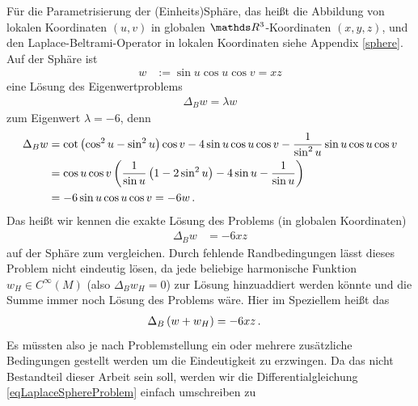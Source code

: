     \begin{beispiel}[Einheitssphäre]
       Für die Parametrisierung der (Einheits)Sphäre, das heißt die Abbildung von lokalen Koordinaten
       \( \left( u,v \right) \) in globalen \(\R^{3} \)-Koordinaten \( \left( x,y,z \right) \), 
       und den Laplace-Beltrami-Operator in lokalen Koordinaten siehe Appendix \ref{sphere}.
       Auf der Sphäre ist
       \begin{align}
         w &:= \sin u \cos u \cos v = x z
       \end{align}
       eine Lösung des Eigenwertproblems
       \begin{align}
         \Delta_{B} w = \lambda w
       \end{align}
       zum Eigenwert \( \lambda = -6 \), denn
       \begin{align}
         \Delta_{B} w &= \cot\left( \cos^{2}u - \sin^{2}u \right)\cos v
                         - 4\sin u \cos u \cos v
                         - \frac{1}{\sin^{2} u} \sin u \cos u \cos v \\
                      &= \cos u \cos v \left( \frac{1}{\sin u} \left( 1 - 2\sin^{2} u \right)
                                             - 4 \sin u - \frac{1}{\sin u} \right) \\
                      &= -6 \sin u \cos u \cos v = -6 w \,\text{.}
       \end{align}
       Das heißt wir kennen die exakte Lösung des Problems (in globalen Koordinaten)
       \begin{align}
         \label{eqLaplaceSphereProblem}
         \Delta_{B} w &= -6 x z
       \end{align}
       auf der Sphäre zum vergleichen.
       Durch fehlende Randbedingungen lässt dieses Problem nicht eindeutig lösen, da jede beliebige harmonische Funktion
       \( w_{H} \in C^{\infty}(M) \) (also \( \Delta_{B} w_{H} = 0 \)) zur Lösung hinzuaddiert werden könnte und die Summe immer noch
       Lösung des Problems wäre. Hier im Speziellem heißt das
       \begin{align}
         \Delta_{B} \left( w + w_{H} \right) &= -6 x z \,\text{.}
       \end{align}
       Es müssten also je nach Problemstellung ein oder mehrere zusätzliche Bedingungen gestellt werden um die Eindeutigkeit zu erzwingen.
       Da das nicht Bestandteil dieser Arbeit sein soll, werden wir die Differentialgleichung \eqref{eqLaplaceSphereProblem} einfach umschreiben zu
       \begin{align}

\end{align}
\end{beispiel}

